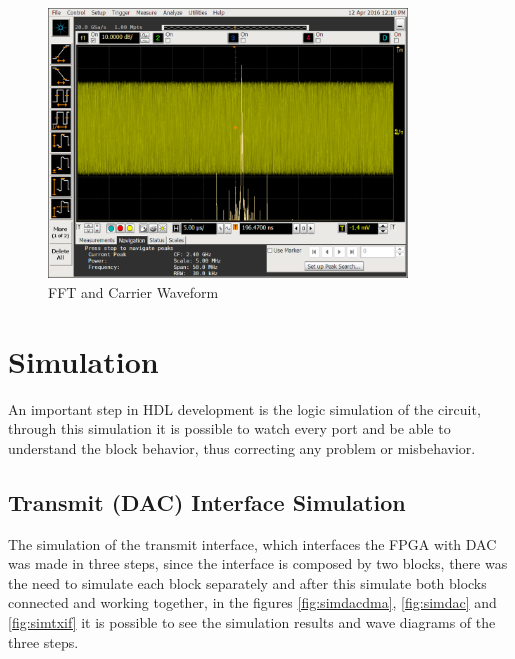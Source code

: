 \begin{figure}[htbp]
    \centering
    \includegraphics[width=0.85\textwidth]{./figures/oscill_fft}
    \caption{ FFT and Carrier Waveform
    \label{fig:oscillfft}}
\end{figure}

\section{Simulation}

An important step in HDL development is the logic simulation of the circuit,
through this simulation it is possible to watch every port and be able to
understand the block behavior, thus correcting any problem or misbehavior.\\

\subsection{Transmit (DAC) Interface Simulation}

The simulation of the transmit interface, which interfaces the FPGA with DAC was
made in three steps, since the interface is composed by two blocks, there was
the need to simulate each block separately and after this simulate both blocks
connected and working together, in the figures \ref{fig:simdacdma},
\ref{fig:simdac} and \ref{fig:simtxif} it is possible to see the simulation
results and wave diagrams of the three steps.\\

